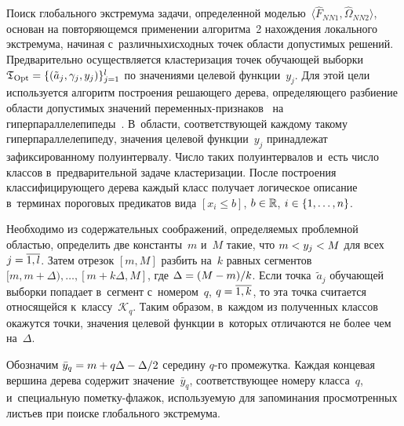 \begin{multicols}{2}
Поиск глобального экстремума  задачи, определенной 
мо\-делью~$\langle\hat{F}_{NN1}, \hat{\Omega}_{NN2}\rangle$, 
основан на повторяющемся применении  алгоритма~2 на\-хож\-де\-ния 
локального экстремума, начиная с~различных\linebreak исходных точек об\-ласти 
допустимых решений.
Предварительно осуществляется  кластеризация точек обучающей 
выборки $\mathfrak{T}_{\mathrm{Opt}}\hm=\{ (\tilde{a}_j,\gamma_j,y_j)\}_{j=1}^l$
 по значениями целевой функции~$y_j$. Для этой цели используется алгоритм
  построения решающего дерева, определяющего разбиение области 
  допустимых значений пе\-ре\-мен\-ных-при\-зна\-ков~\cite{6-don} на 
  гиперпараллелепипеды~\cite{15-don}. В~об\-ласти, соответствующей 
  каждому такому гиперпараллелепипеду, значения целевой функции~$y_j$ 
  принадлежат зафиксированному полуинтервалу. Число таких полуинтервалов и~есть 
  число классов в~предварительной задаче кластеризации. После построения 
  классифицирующего дерева каждый класс получает логическое описание в~терминах 
  пороговых предикатов вида $[x_i \leq b]$,  $b\hm\in \mathbb{R}$, 
   $i\hm\in \{1,\ldots ,n \}$.

Необходимо из содержательных соображений, определяемых 
проблемной областью, определить две константы~$m$ и~$M$ такие, что $m \hm< y_j \hm< M$ 
для всех $j\hm=\overline{1,l}$. Затем отрезок $[m,M ]$ разбить на~$k$ 
равных сегментов $[m, m+\Delta),\dots,[m+k\Delta,M]$, где $\Delta\hm=(M-m)/k$.
Если точка~$\tilde{a}_j$ обучающей выборки попадает в~сегмент с~номером~$q$, 
 $q\hm=\overline{1,k}$, то эта точка считается относящейся к~классу~$\mathcal{K}_q$.
Таким образом, в~каждом из  полученных классов окажутся точки, значения
 целевой функции в~которых отличаются не более чем на~$\Delta$.

Обозначим $\bar{y}_q = m\hm+q  \Delta \hm- \Delta/2$ середину $q$-го
 промежутка. Каждая концевая вершина дерева содержит значение~$\bar{y}_q$, 
 соответствующее номеру класса~$q$, и~специальную по\-мет\-ку-фла\-жок, 
 исполь\-зу\-емую для запоминания просмотренных листьев при поиске глобального 
 экстремума.

\setcounter{table}{4}
\begin{table*}\small %
\begin{center}
\label{TabData}
\vspace*{2ex}


\end{center}
\end{table*}
\end{multicols}
